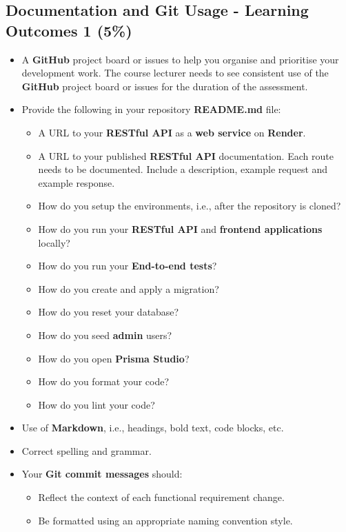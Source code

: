 \documentclass{article}
\begin{document}
\subsection*{Documentation and Git Usage - Learning Outcomes 1 (5\%)}
\begin{itemize}
	\item A \textbf{GitHub} project board or issues to help you organise and prioritise your development work. The course lecturer needs to see consistent use of the \textbf{GitHub} project board or issues for the duration of the assessment.
	\item Provide the following in your repository \textbf{README.md} file:
	\begin{itemize}
		\item A URL to your \textbf{RESTful API} as a \textbf{web service} on \textbf{Render}.
		\item A URL to your published \textbf{RESTful API} documentation. Each route needs to be documented. Include a description, example request and example response.
		\item How do you setup the environments, i.e., after the repository is cloned?
		\item How do you run your \textbf{RESTful API} and \textbf{frontend applications} locally?
		\item How do you run your \textbf{End-to-end tests}?
		\item How do you create and apply a migration?  
		\item How do you reset your database?
		\item How do you seed \textbf{admin} users?
		\item How do you open \textbf{Prisma Studio}?
		\item How do you format your code?
		\item How do you lint your code?		
	\end{itemize}
    \item Use of \textbf{Markdown}, i.e., headings, bold text, code blocks, etc.
    \item Correct spelling and grammar.
    \item Your \textbf{Git commit messages} should:
    \begin{itemize}
      \item Reflect the context of each functional requirement change.
      \item Be formatted using an appropriate naming convention style.
    \end{itemize}
\end{itemize}
\end{document}
